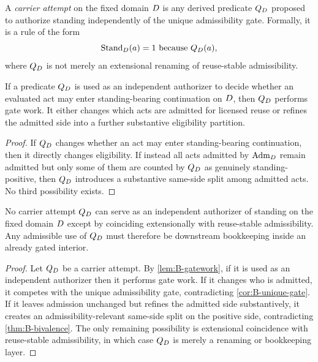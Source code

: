 \begin{definition}
A \emph{carrier attempt} on the fixed domain $D$ is any derived predicate $Q_D$ proposed to authorize standing independently of the unique admissibility gate. Formally, it is a rule of the form
\[
\mathrm{Stand}_D(a)=1 \text{ because } Q_D(a),
\]
where $Q_D$ is not merely an extensional renaming of reuse-stable admissibility.
\end{definition}

\begin{lemma}
\label{lem:B-gatework}
If a predicate $Q_D$ is used as an independent authorizer to decide whether an evaluated act may enter standing-bearing continuation on $D$, then $Q_D$ performs gate work. It either changes which acts are admitted for licensed reuse or refines the admitted side into a further substantive eligibility partition.
\end{lemma}

\begin{proof}
If $Q_D$ changes whether an act may enter standing-bearing continuation, then it directly changes eligibility. If instead all acts admitted by $\mathrm{Adm}_D$ remain admitted but only some of them are counted by $Q_D$ as genuinely standing-positive, then $Q_D$ introduces a substantive same-side split among admitted acts. No third possibility exists.
\end{proof}

\begin{theorem}
\label{thm:B-no-carriers}
No carrier attempt $Q_D$ can serve as an independent authorizer of standing on the fixed domain $D$ except by coinciding extensionally with reuse-stable admissibility. Any admissible use of $Q_D$ must therefore be downstream bookkeeping inside an already gated interior.
\end{theorem}

\begin{proof}
Let $Q_D$ be a carrier attempt. By \cref{lem:B-gatework}, if it is used as an independent authorizer then it performs gate work. If it changes who is admitted, it competes with the unique admissibility gate, contradicting \cref{cor:B-unique-gate}. If it leaves admission unchanged but refines the admitted side substantively, it creates an admissibility-relevant same-side split on the positive side, contradicting \cref{thm:B-bivalence}. The only remaining possibility is extensional coincidence with reuse-stable admissibility, in which case $Q_D$ is merely a renaming or bookkeeping layer.
\end{proof}

